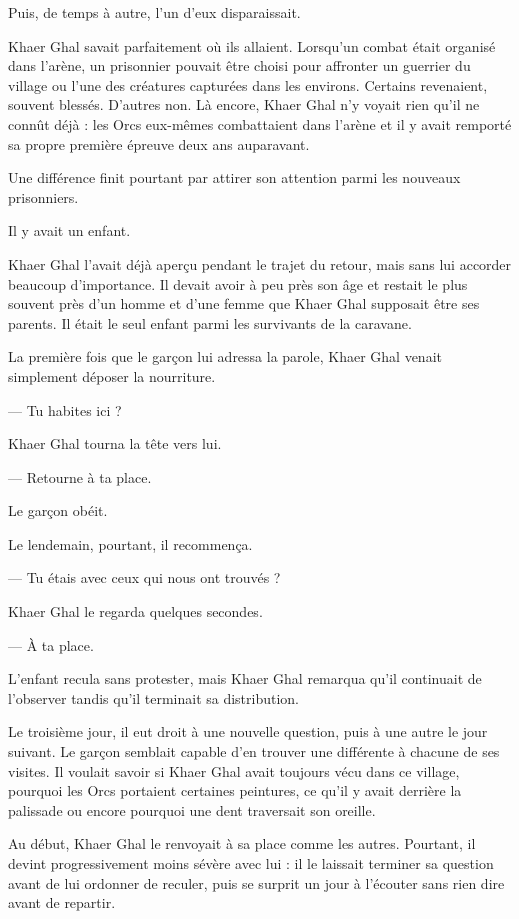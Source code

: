 Puis, de temps à autre, l'un d'eux disparaissait.

Khaer Ghal savait parfaitement où ils allaient. Lorsqu'un combat était organisé
dans l'arène, un prisonnier pouvait être choisi pour affronter un guerrier du
village ou l'une des créatures capturées dans les environs. Certains
revenaient, souvent blessés. D'autres non. Là encore, Khaer Ghal n'y voyait
rien qu'il ne connût déjà : les Orcs eux-mêmes combattaient dans l'arène et il
y avait remporté sa propre première épreuve deux ans auparavant.

Une différence finit pourtant par attirer son attention parmi les nouveaux
prisonniers.

Il y avait un enfant.

Khaer Ghal l'avait déjà aperçu pendant le trajet du retour, mais sans lui
accorder beaucoup d'importance. Il devait avoir à peu près son âge et restait
le plus souvent près d'un homme et d'une femme que Khaer Ghal supposait être
ses parents. Il était le seul enfant parmi les survivants de la caravane.

La première fois que le garçon lui adressa la parole, Khaer Ghal venait
simplement déposer la nourriture.

— Tu habites ici ?

Khaer Ghal tourna la tête vers lui.

— Retourne à ta place.

Le garçon obéit.

Le lendemain, pourtant, il recommença.

— Tu étais avec ceux qui nous ont trouvés ?

Khaer Ghal le regarda quelques secondes.

— À ta place.

L'enfant recula sans protester, mais Khaer Ghal remarqua qu'il continuait de
l'observer tandis qu'il terminait sa distribution.

Le troisième jour, il eut droit à une nouvelle question, puis à une autre le
jour suivant. Le garçon semblait capable d'en trouver une différente à chacune
de ses visites. Il voulait savoir si Khaer Ghal avait toujours vécu dans ce
village, pourquoi les Orcs portaient certaines peintures, ce qu'il y avait
derrière la palissade ou encore pourquoi une dent traversait son oreille.

Au début, Khaer Ghal le renvoyait à sa place comme les autres. Pourtant, il
devint progressivement moins sévère avec lui : il le laissait terminer sa
question avant de lui ordonner de reculer, puis se surprit un jour à l'écouter
sans rien dire avant de repartir.

